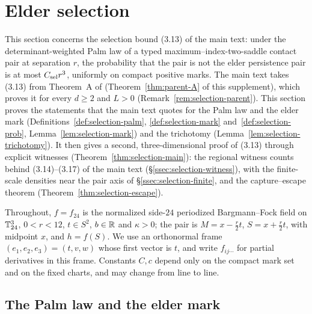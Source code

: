 \section{Elder selection}\label{sec:selection}

This section concerns the selection bound (3.13) of the main text: under the determinant-weighted Palm law of a typed maximum--index-two-saddle contact pair at separation $r$, the probability that the pair is not the elder persistence pair is at most $C_{\rm sel}r^3$, uniformly on compact positive marks. The main text takes (3.13) from Theorem~A of \cite{parentP} (Theorem~\ref{thm:parent-A} of this supplement), which proves it for every $d\ge2$ and $L>0$ (Remark~\ref{rem:selection-parent}). This section proves the statements that the main text quotes for the Palm law and the elder mark (Definitions~\ref{def:selection-palm}, \ref{def:selection-mark} and~\ref{def:selection-prob}, Lemma~\ref{lem:selection-mark}) and the trichotomy (Lemma~\ref{lem:selection-trichotomy}). It then gives a second, three-dimensional proof of (3.13) through explicit witnesses (Theorem~\ref{thm:selection-main}): the regional witness counts behind (3.14)--(3.17) of the main text (\S\ref{ssec:selection-witness}), with the finite-scale densities near the pair axis of \S\ref{ssec:selection-finite}, and the capture--escape theorem (Theorem~\ref{thm:selection-escape}).

Throughout, $f=f_{24}$ is the normalized side-$24$ periodized Bargmann--Fock field on $\mathbb T^3_{24}$, $0<r<12$, $t\in S^2$, $b\in\mathbb R$ and $\kappa>0$; the pair is $M=x-\frac r2t$, $S=x+\frac r2t$, with midpoint $x$, and $h=f(S)$. We use an orthonormal frame $(e_1,e_2,e_3)=(t,v,w)$ whose first vector is $t$, and write $f_{ij\cdots}$ for partial derivatives in this frame. Constants $C,c$ depend only on the compact mark set and on the fixed charts, and may change from line to line.

\subsection{The Palm law and the elder mark}\label{ssec:selection-palm}

